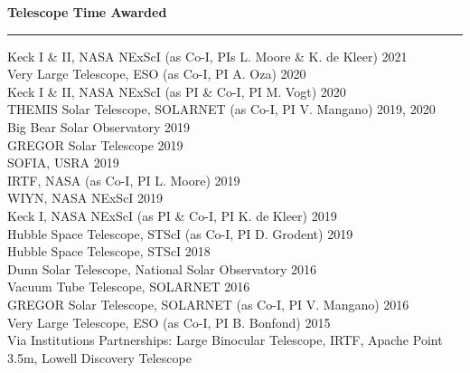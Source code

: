 \documentclass[12pt]{report}
\begin{document}
\noindent\bf{Telescope Time Awarded}\rm \hspace*{\fill} \\
\rule{\textwidth}{1pt}
Keck I \& II, NASA NExScI (as Co-I, PIs L. Moore \& K. de Kleer) \hfill 2021\\
Very Large Telescope, ESO (as Co-I, PI A. Oza) \hfill 2020\\
Keck I \& II, NASA NExScI  (as PI \& Co-I, PI M. Vogt) \hfill 2020\\
THEMIS Solar Telescope, SOLARNET (as Co-I, PI V. Mangano) \hfill 2019, 2020\\
Big Bear Solar Observatory \hfill 2019\\
GREGOR Solar Telescope \hfill 2019\\
SOFIA, USRA \hfill 2019\\
IRTF, NASA (as Co-I, PI L. Moore) \hfill 2019\\
WIYN, NASA NExScI \hfill 2019\\
Keck I, NASA NExScI (as PI \& Co-I, PI K. de Kleer) \hfill 2019\\
Hubble Space Telescope, STScI (as Co-I, PI D. Grodent) \hfill 2019\\
Hubble Space Telescope, STScI \hfill 2018\\
Dunn Solar Telescope, National Solar Observatory \hfill 2016\\
Vacuum Tube Telescope, SOLARNET \hfill 2016\\
GREGOR Solar Telescope, SOLARNET (as Co-I, PI V. Mangano) \hfill 2016\\
Very Large Telescope, ESO (as Co-I, PI B. Bonfond) \hfill 2015\\
Via Institutions Partnerships: Large Binocular Telescope, IRTF, Apache Point 3.5m, Lowell Discovery Telescope\\
\end{document}
